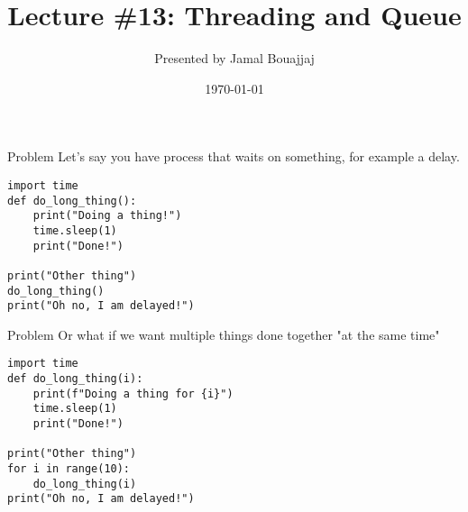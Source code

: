 %
%



\usepackage{media9}

\title{Lecture \#13: Threading and Queue}
\date{\today}
\author{Presented by Jamal Bouajjaj}

\makeatletter
{}%
\makeatother



\maketitle

\begin{frame}[containsverbatim]{Problem}
Let's say you have process that waits on something, for example a delay.
    \begin{verbatim}
import time
def do_long_thing():
    print("Doing a thing!")
    time.sleep(1)
    print("Done!")

print("Other thing")
do_long_thing()
print("Oh no, I am delayed!")
  \end{verbatim}
\end{frame}


\begin{frame}[containsverbatim]{Problem}
Or what if we want multiple things done together "at the same time"
    \begin{verbatim}
import time
def do_long_thing(i):
    print(f"Doing a thing for {i}")
    time.sleep(1)
    print("Done!")

print("Other thing")
for i in range(10):
    do_long_thing(i)
print("Oh no, I am delayed!")
  \end{verbatim}
\end{frame}

